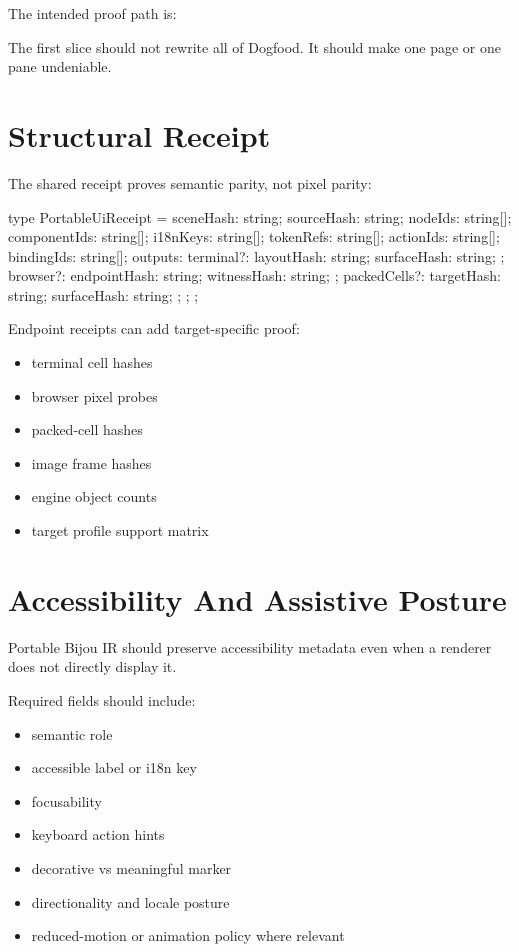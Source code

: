 The intended proof path is:



The first slice should not rewrite all of Dogfood. It should make one page or one pane undeniable.

\section{Structural Receipt}\label{record-139-structural-receipt}

The shared receipt proves semantic parity, not pixel parity:

\begin{CodeBlock}
type PortableUiReceipt = {
  sceneHash: string;
  sourceHash: string;
  nodeIds: string[];
  componentIds: string[];
  i18nKeys: string[];
  tokenRefs: string[];
  actionIds: string[];
  bindingIds: string[];
  outputs: {
    terminal?: {
      layoutHash: string;
      surfaceHash: string;
    };
    browser?: {
      endpointHash: string;
      witnessHash: string;
    };
    packedCells?: {
      targetHash: string;
      surfaceHash: string;
    };
  };
};
\end{CodeBlock}

Endpoint receipts can add target-specific proof:

\begin{itemize}
\tightlist
\item
  terminal cell hashes
\item
  browser pixel probes
\item
  packed-cell hashes
\item
  image frame hashes
\item
  engine object counts
\item
  target profile support matrix
\end{itemize}

\section{Accessibility And Assistive Posture}\label{record-139-accessibility-and-assistive-posture}

Portable Bijou IR should preserve accessibility metadata even when a renderer does not directly display it.

Required fields should include:

\begin{itemize}
\tightlist
\item
  semantic role
\item
  accessible label or i18n key
\item
  focusability
\item
  keyboard action hints
\item
  decorative vs meaningful marker
\item
  directionality and locale posture
\item
  reduced-motion or animation policy where relevant
\end{itemize}

